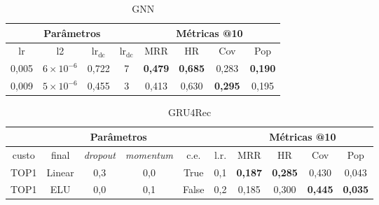 \begin{table}[htbp]
  \centering
  \begin{tabular}{|c|c|c|c|c|c|c|c|}
    \hline
      \multicolumn{4}{|c|}{Parâmetros} & \multicolumn{4}{c|}{Métricas @10} \\
      \hline
      lr & l2 & $\text{lr}_\text{dc}$ & $\text{lr}_\text{dc}$ & MRR & HR & Cov & Pop \\
      \hline
      0,005 & $6 \times 10^{-6}$ & 0,722 & 7 & \textbf{0,479} & \textbf{0,685} & 0,283 & \textbf{0,190} \\
      \hline
      0,009 & $5 \times 10^{-6}$ & 0,455 & 3 & 0,413 & 0,630 & \textbf{0,295} & 0,195 \\
      \hline
\end{tabular}
      \caption{GNN}
      \label{opt:GNN_last}
\end{table}

\begin{table}[htbp]
  \centering
  \begin{tabular}{|c|c|c|c|c|c|c|c|c|c|}
    \hline
      \multicolumn{6}{|c|}{Parâmetros} & \multicolumn{4}{c|}{Métricas @10} \\
      \hline
      custo & final & \textit{dropout} & \textit{momentum} & c.e. & l.r. & MRR & HR & Cov & Pop \\
      \hline
      TOP1 & Linear & 0,3 & 0,0 & True & 0,1 & \textbf{0,187} & \textbf{0,285} & 0,430 & 0,043 \\
      \hline
      TOP1 & ELU & 0,0 & 0,1 & False & 0,2 & 0,185 & 0,300 & \textbf{0,445} & \textbf{0,035} \\
      \hline
\end{tabular}
      \caption{GRU4Rec}
      \label{opt:GRU4Rec_last}
\end{table}

